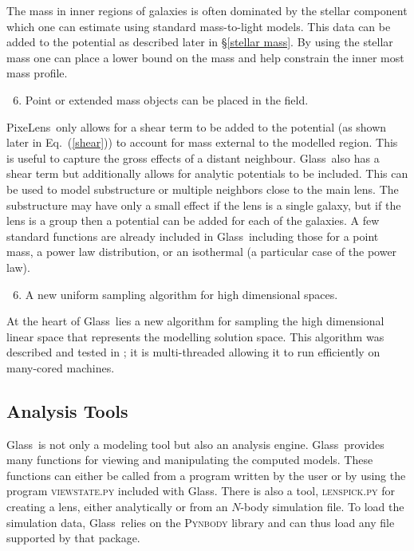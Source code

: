 \documentclass[galley,usenatbib]{mn2e}
\newcommand{\Glass}{{\sc Glass}}
\newcommand{\PixeLens}{{\sc PixeLens}}
\newcommand{\eqnref}[1] {Eq.~(\ref{#1})}
\newcommand{\secref}[1] {\S\ref{#1}}
\begin{document}
%
The mass in inner regions of galaxies is often dominated by the stellar component
which one can estimate using standard mass-to-light models. This data can be added
to the potential as described later in \secref{stellar mass}. By using the stellar
mass one can place a lower bound on the mass and help constrain the inner most
mass profile.
%
\begin{enumerate}
  \setcounter{enumi}{5}
  \item Point or extended mass objects can be placed in the field.
\end{enumerate}
%
\PixeLens\ only allows for a shear term to be added to the potential (as shown
later in \eqnref{shear}) to account for mass external to the modelled region. This
is useful to capture the gross effects of a distant neighbour. \Glass\ also
has a shear term but additionally allows for analytic potentials to
be included. This can be used to model substructure or multiple neighbors close
to the main lens. The substructure may have only a small effect if the lens is
a single galaxy, but if the lens is a group then a potential can be added for
each of the galaxies. A few standard functions are already included in \Glass\
including those for a point mass, a power law distribution, or an isothermal (a
particular case of the power law).
%
\begin{enumerate}
  \setcounter{enumi}{5}
  \item A new uniform sampling algorithm for high dimensional spaces.
\end{enumerate}
%
At the heart of \Glass\ lies a new algorithm for sampling the high dimensional
linear space that represents the modelling solution space. This algorithm was
described and tested in \cite{2012MNRAS.425.3077L}; it is 
multi-threaded allowing it to run efficiently on many-cored machines.  

\subsection{Analysis Tools}\label{sec:tools}
\Glass\ is not only a modeling tool but also an analysis engine. \Glass\
provides many functions for viewing and manipulating the computed models.
These functions can either be called from a program written by the user or by
using the program \textsc{viewstate.py} included with \Glass. There is also a
tool, \textsc{lenspick.py} for creating a lens, either analytically or from an
$N$-body simulation file. To load the simulation data, \Glass\ relies on the
\textsc{Pynbody} library \citep{pynbody} and can thus load any file supported by that package.
\end{document}
